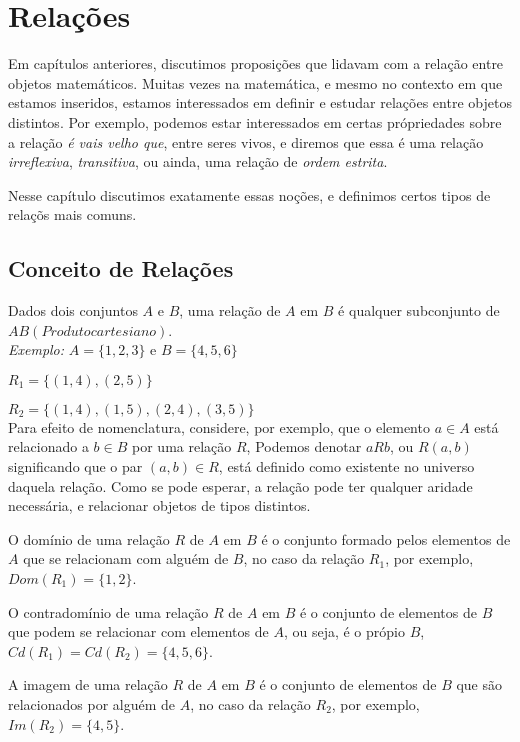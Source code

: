 \chapter{Relações}
Em capítulos anteriores, discutimos proposições que lidavam com a relação entre objetos matemáticos. Muitas vezes na matemática, e mesmo no contexto em que estamos inseridos, estamos interessados em definir e estudar relações entre objetos distintos. Por exemplo, podemos estar interessados em certas própriedades sobre a relação \textit{é vais velho que}, entre seres vivos, e diremos que essa é uma relação \textit{irreflexiva}, \textit{transitiva}, ou ainda, uma relação de \textit{ordem estrita}.

Nesse capítulo discutimos exatamente essas noções, e definimos certos tipos de relaçõs mais comuns.

\section{Conceito de Relações}

Dados dois conjuntos $A$ e $B$, uma relação de $A$ em $B$ é qualquer subconjunto de $A$\times $B (Produto  cartesiano)$.\\

\textit{Exemplo:} $A = \{1,2,3\} $ e $ B = \{4,5,6\}$

$R_{1} = \{(1,4),(2,5)\}$

$R_{2} = \{(1,4),(1,5),(2,4),(3,5)\}$\\

Para efeito de nomenclatura, considere, por exemplo, que o elemento $a \in A$ está relacionado a $b \in B$ por uma relação $R$, Podemos denotar $aRb$, ou $R(a,b)$ significando que o par $(a,b)\in R$, está definido como existente no universo daquela relação. Como se pode esperar, a relação pode ter qualquer aridade necessária, e relacionar objetos de tipos distintos.

O domínio de uma relação $R$ de $A$ em $B$ é o conjunto formado pelos elementos de $A$ que se relacionam com alguém de $B$, no caso da relação $R_{1}$, por exemplo, $Dom(R_{1}) = \{1,2\}$.

O contradomínio de uma relação $R$ de $A$ em $B$ é o conjunto de elementos de $B$ que podem se relacionar com elementos de $A$, ou seja, é o própio $B$, $Cd(R_{1}) = Cd(R_{2}) =  \{4,5,6\}$.

A imagem de uma relação $R$ de $A$ em $B$ é o conjunto de elementos de $B$ que são relacionados por alguém de $A$, no caso da relação $R_{2}$, por exemplo, $Im(R_{2}) = \{4,5\}$.

